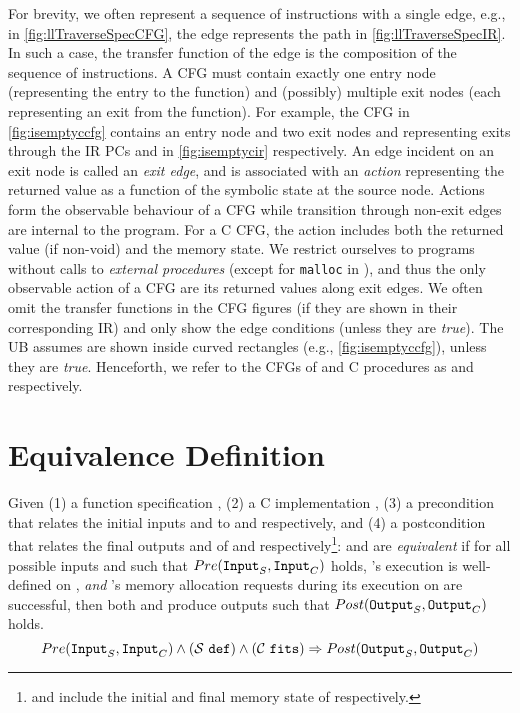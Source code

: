 For brevity, we often represent a sequence of instructions with a single edge, e.g.,
in \cref{fig:llTraverseSpecCFG}, the edge  represents the path  in \cref{fig:llTraverseSpecIR}.
In such a case, the transfer function of the edge is the composition of the sequence of instructions.
A CFG must contain exactly one entry node (representing the entry to the function) and (possibly)
multiple exit nodes (each representing an exit from the function).
For example, the CFG in \cref{fig:isemptyccfg} contains an entry node  and two exit nodes
 and  representing exits through the IR PCs  and  in \cref{fig:isemptycir} respectively.
An edge incident on an exit node is called an {\em exit edge}, and is associated with an {\em action} representing
the returned value as a function of the symbolic state at the source node.
Actions form the observable behaviour of a CFG while transition through non-exit edges are internal to the program.
For a C CFG, the action includes both the returned value (if non-void) and the memory state.
We restrict ourselves to programs without calls to {\em external procedures} (except for {\tt malloc} in \cprog{}),
and thus the only observable action of a CFG are its returned values along exit edges.
We often omit the transfer functions in the CFG figures (if they are shown in their corresponding IR)
and only show the edge conditions (unless they are {\em true}).
The UB assumes are shown inside curved rectangles (e.g., \cref{fig:isemptyccfg}), unless they are {\em true}.
Henceforth, we refer to the CFGs of \SpecL{} and C procedures as \sprog{} and \cprog{} respectively.

\section{Equivalence Definition}
\label{sec:eqdef}
Given (1) a \SpecL{} function specification \sprog{}, (2) a C implementation \cprog{},
(3) a precondition \pre{} that relates the initial inputs  and  to
\sprog{} and \cprog{} respectively, and (4) a postcondition \post{} that relates the final outputs
 and  of \sprog{} and \cprog{} respectively\footnote{ and 
include the initial and final memory state of \cprog{} respectively.}:
\sprog{} and \cprog{} are {\em equivalent} if for all possible inputs  and  such that
${Pre}{}({\tt Input}_{S},{\tt Input}_{C})$ holds,
\sprog{}'s execution is well-defined on , {\em and}
\cprog{}'s memory allocation requests during its execution on  are successful,
then both \sprog{} and \cprog{} produce outputs such that ${Post}{}({\tt Output}_{S},{\tt Output}_{C})$ holds.
$$
{Pre}{}({\tt Input}_{S},{\tt Input}_{C}) \land {({\ensuremath{\mathcal{S}}}{}\ {\tt def})}{} \land {({\ensuremath{\mathcal{C}}}{}\ {\tt fits})}{} \Rightarrow {\ensuremath{Post}}{}({\tt Output}_{S},{\tt Output}_{C})
$$

